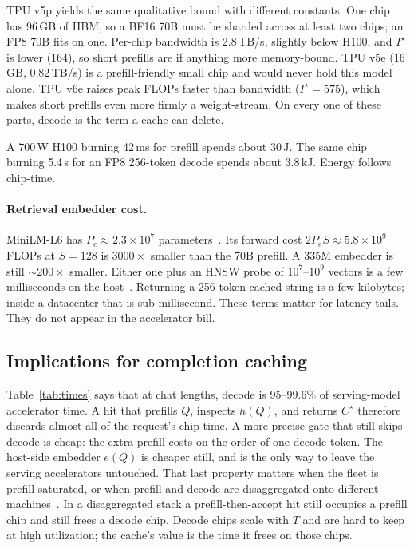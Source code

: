 TPU v5p yields the same qualitative bound with different constants. One chip has 96\,GB of HBM, so a BF16 70B must be sharded across at least two chips; an FP8 70B fits on one. Per-chip bandwidth is 2.8\,TB/s, slightly below H100, and $I^\star$ is lower (164), so short prefills are if anything more memory-bound. TPU v5e (16\,GB, 0.82\,TB/s) is a prefill-friendly small chip and would never hold this model alone. TPU v6e raises peak FLOPs faster than bandwidth ($I^\star=575$), which makes short prefills even more firmly a weight-stream. On every one of these parts, decode is the term a cache can delete.

A 700\,W H100 burning 42\,ms for prefill spends about 30\,J. The same chip burning 5.4\,s for an FP8 256-token decode spends about 3.8\,kJ. Energy follows chip-time.

\paragraph{Retrieval embedder cost.}
MiniLM-L6 has $P_e\approx 2.3\times 10^7$ parameters~\citep{wang2020minilm}. Its forward cost $2P_e S\approx 5.8\times 10^9$ FLOPs at $S=128$ is $3000\times$ smaller than the 70B prefill. A 335M embedder is still $\sim 200\times$ smaller. Either one plus an HNSW probe of $10^7$--$10^9$ vectors is a few milliseconds on the host~\citep{malkov2018hnsw}. Returning a 256-token cached string is a few kilobytes; inside a datacenter that is sub-millisecond. These terms matter for latency tails. They do not appear in the accelerator bill.

\subsection{Implications for completion caching}
\label{sec:cost-method}

Table~\ref{tab:times} says that at chat lengths, decode is 95--99.6\% of serving-model accelerator time. A hit that prefills $Q$, inspects $h(Q)$, and returns $C^\star$ therefore discards almost all of the request's chip-time. A more precise gate that still skips decode is cheap: the extra prefill costs on the order of one decode token. The host-side embedder $e(Q)$ is cheaper still, and is the only way to leave the serving accelerators untouched. That last property matters when the fleet is prefill-saturated, or when prefill and decode are disaggregated onto different machines~\citep{zhong2024distserve}. In a disaggregated stack a prefill-then-accept hit still occupies a prefill chip and still frees a decode chip. Decode chips scale with $T$ and are hard to keep at high utilization; the cache's value is the time it frees on those chips.

